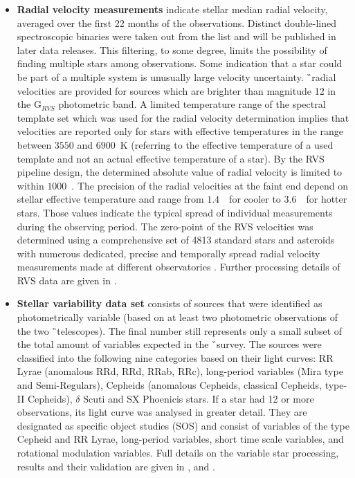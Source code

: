 \begin{itemize}
	\item \textbf{Radial velocity measurements} indicate stellar median radial velocity, averaged over the first 22 months of the observations. Distinct double-lined spectroscopic binaries were taken out from the list and will be published in later data releases. This filtering, to some degree, limits the possibility of finding multiple stars among observations. Some indication that a star could be part of a multiple system is unusually large velocity uncertainty. \G\ radial velocities are provided for sources which are brighter than magnitude 12 in the G$_{RVS}$ photometric band. A limited temperature range of the spectral template set which was used for the radial velocity determination implies that velocities are reported only for stars with effective temperatures in the range between $3550$ and $6900$~K (referring to the effective temperature of a used template and not an actual effective temperature of a star). By the RVS pipeline design, the determined absolute value of radial velocity is limited to within $1000$~\kms. The precision of the radial velocities at the faint end depend on stellar effective temperature and range from $1.4$~\kms\ for cooler to $3.6$~\kms\ for hotter stars. Those values indicate the typical spread of individual measurements during the observing period. The zero-point of the RVS velocities was determined using a comprehensive set of 4813 standard stars and asteroids with numerous dedicated, precise and temporally spread radial velocity measurements made at different observatories \cite{2018A&A...616A...7S}. Further processing details of RVS data are given in \citet{2018A&A...616A...6S}.
	
	\item \textbf{Stellar variability data set} consists of sources that were identified as photometrically variable (based on at least two photometric observations of the two \G\ telescopes). The final number still represents only a small subset of the total amount of variables expected in the \G\ survey. The sources were classified into the following nine categories based on their light curves: RR Lyrae (anomalous RRd, RRd, RRab, RRc), long-period variables (Mira type and Semi-Regulars), Cepheids (anomalous Cepheids, classical Cepheids, type-II Cepheids), $\delta$ Scuti and SX Phoenicis stars. If a star had 12 or more observations, its light curve was analysed in greater detail. They are designated as specific object studies (SOS) and consist of variables of the type Cepheid and RR Lyrae, long-period variables, short time scale variables, and rotational modulation variables. Full details on the variable star processing, results and their validation are given in \citet{2018A&A...618A..30H, 2018A&A...618A..58M, 2018A&A...620A.127M}, and \cite{2019A&A...622A..60C}.
	

\end{itemize}
